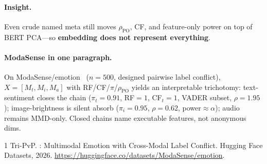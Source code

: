 \documentclass[11pt]{article}
\begin{document}
\paragraph{Insight.}
Even crude named meta still moves $\rho_{\mathrm{PO}}$, CF, and
feature-only power on top of BERT PCA---so
\textbf{embedding does not represent everything}.

\paragraph{ModaSense in one paragraph.}
On ModaSense/emotion~\cite{modasense_emotion_2026} ($n{=}500$,
designed pairwise label conflict), $X{=}[M_t,M_i,M_a]$ with
RF/CF/$\pi$/$\rho_{\mathrm{PO}}$ yields an interpretable trichotomy:
text-sentiment closes the chain
($\pi_t{=}0.91$, RF${=}1$, CF$_t{=}1$, VADER subset, $\rho{=}1.95$);
image-brightness is silent absorb
($\pi_i{=}0.95$, $\rho{=}0.62$, power${\approx}\alpha$);
audio remains MMD-only. Closed chains name executable features, not
anonymous dims.

\begin{thebibliography}{1}
Tri-PvP.
: Multimodal Emotion with Cross-Modal Label Conflict.
\newblock Hugging Face Datasets, 2026.
\newblock \url{https://huggingface.co/datasets/ModaSense/emotion}.
\end{thebibliography}
\end{document}
